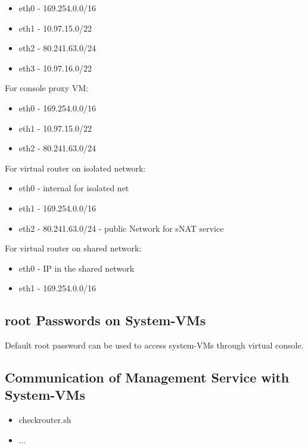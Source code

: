 \begin{itemize}
  \item eth0 - 169.254.0.0/16
  \item eth1 - 10.97.15.0/22
  \item eth2 - 80.241.63.0/24
  \item eth3 - 10.97.16.0/22
\end{itemize}

For console proxy VM:

\begin{itemize}
  \item eth0 - 169.254.0.0/16
  \item eth1 - 10.97.15.0/22
  \item eth2 - 80.241.63.0/24
\end{itemize}

For virtual router on isolated network:

\begin{itemize}
  \item eth0 - internal for isolated net
  \item eth1 - 169.254.0.0/16
  \item eth2 - 80.241.63.0/24 - public Network for sNAT service
\end{itemize}

For virtual router on shared network:

\begin{itemize}
  \item eth0 - IP in the shared network
  \item eth1 - 169.254.0.0/16
\end{itemize}


\subsection{root Passwords on System-VMs}

Default root password can be used to access system-VMs through virtual console.

\subsection{Communication of Management Service with System-VMs}

\begin{itemize}
  \item checkrouter.sh 
  \item ...
\end{itemize}

